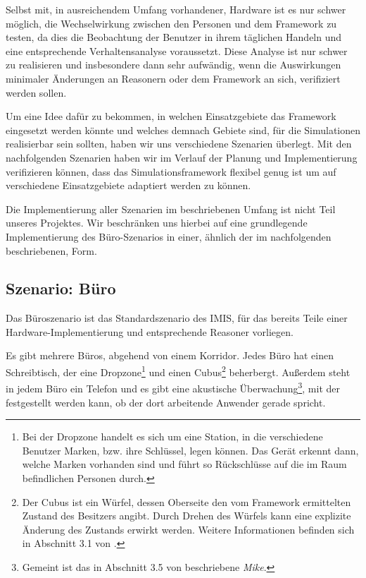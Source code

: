 Selbst mit, in ausreichendem Umfang vorhandener, Hardware ist es nur schwer möglich, die Wechselwirkung zwischen den Personen und dem Framework zu testen, da dies die Beobachtung der Benutzer in ihrem täglichen Handeln und eine entsprechende Verhaltensanalyse voraussetzt. Diese Analyse ist nur schwer zu realisieren und insbesondere dann sehr aufwändig, wenn die Auswirkungen minimaler Änderungen an Reasonern oder dem Framework an sich, verifiziert werden sollen.

Um eine Idee dafür zu bekommen, in welchen Einsatzgebiete das Framework eingesetzt werden könnte und welches demnach Gebiete sind, für die Simulationen realisierbar sein sollten, haben wir uns verschiedene Szenarien überlegt. Mit den nachfolgenden Szenarien haben wir im Verlauf der Planung und Implementierung verifizieren können, dass das Simulationsframework flexibel genug ist um auf verschiedene Einsatzgebiete adaptiert werden zu können.

Die Implementierung aller Szenarien im beschriebenen Umfang ist nicht Teil unseres Projektes. Wir beschränken uns hierbei auf eine grundlegende Implementierung des Büro-Szenarios in einer, ähnlich der im nachfolgenden beschriebenen, Form.

\subsection*{Szenario: Büro}

Das Büroszenario ist das Standardszenario des IMIS, für das bereits Teile einer Hardware-Implemen\-tierung und entsprechende Reasoner vorliegen.

Es gibt mehrere Büros, abgehend von einem Korridor. Jedes Büro hat einen Schreibtisch, der eine Dropzone\footnote{Bei der Dropzone handelt es sich um eine Station, in die verschiedene Benutzer Marken, bzw. ihre Schlüssel, legen können. Das Gerät erkennt dann, welche Marken vorhanden sind und führt so Rückschlüsse auf die im Raum befindlichen Personen durch.} und einen Cubus\footnote{Der Cubus ist ein Würfel, dessen Oberseite den vom Framework ermittelten Zustand des Besitzers angibt. Durch Drehen des Würfels kann eine explizite Änderung des Zustands erwirkt werden. Weitere Informationen befinden sich in Abschnitt 3.1 von \cite{doku-sensor-aktuator}.} beherbergt. Außerdem steht in jedem Büro ein Telefon und es gibt eine akustische Überwachung\footnote{Gemeint ist das in Abschnitt 3.5 von \cite{doku-sensor-aktuator} beschriebene \emph{Mike}.}, mit der festgestellt werden kann, ob der dort arbeitende Anwender gerade spricht. 

